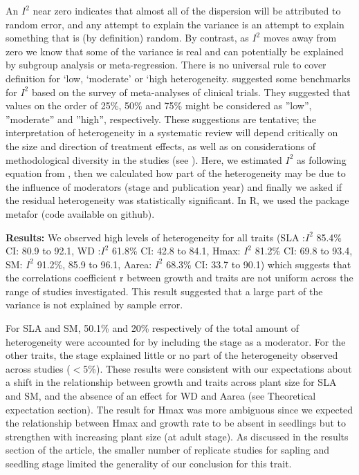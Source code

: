\documentclass[a4paper,11pt]{article}
\begin{document}
\begin{appendices}
An $I^{2}$ near zero indicates that almost all of the dispersion will be attributed to random error, and any attempt to explain the variance is an attempt to explain something that is (by definition) random. By contrast, as $I^{2}$ moves away from zero we know that some of the variance is real and can potentially be explained by subgroup analysis or meta-regression.
There is no universal rule to cover definition for ‘low, ‘moderate’ or ‘high heterogeneity. \citealt{Higgins:2003hz} suggested some benchmarks for $I^{2}$ based on the survey of meta-analyses of clinical trials. They suggested that values on the order of 25\%, 50\% and 75\% might be considered as ''low'', ''moderate'' and ''high'', respectively. These suggestions are tentative; the interpretation of heterogeneity in a systematic review will depend critically on the size and direction of treatment effects, as well as on considerations of methodological diversity in the studies (see \citealt{Borenstein:2009um}).
Here, we estimated $I^{2}$ as following equation from \citealt{Higgins:2002iq}, then we calculated how part of the heterogeneity may be due to the influence of moderators (stage and publication year) and finally we asked if the residual heterogeneity was statistically significant. In R, we used the package metafor (code available on github).


\textbf{Results:} We observed high levels of heterogeneity for all traits (SLA :$I^{2}$ 85.4\% CI: 80.9 to 92.1, WD :$I^{2}$ 61.8\% CI: 42.8 to 84.1, Hmax: $I^{2}$ 81.2\% CI: 69.8 to 93.4, SM: $I^{2}$ 91.2\%, 85.9 to 96.1, Aarea: $I^{2}$ 68.3\% CI: 33.7 to 90.1) which suggests that the correlations coefficient r between growth and traits are not uniform across the range of studies investigated. This result suggested that a large part of the variance is not explained by sample error.

For SLA and SM, 50.1\% and 20\% respectively of the total amount of heterogeneity were accounted for by including the stage as a moderator. For the other traits, the stage explained little or no part of the heterogeneity observed across studies ($<$5\%). These results were consistent with our expectations about a shift in the relationship between growth and traits across plant size for SLA and SM, and the absence of an effect for WD and Aarea (see Theoretical expectation section). The result for Hmax was more ambiguous since we expected the relationship between Hmax and growth rate to be absent in seedlings but to strengthen with increasing plant size (at adult stage). As discussed in the results section of the article, the smaller number of replicate studies for sapling and seedling stage limited the generality of our conclusion for this trait.


\end{appendices}
\end{document}
